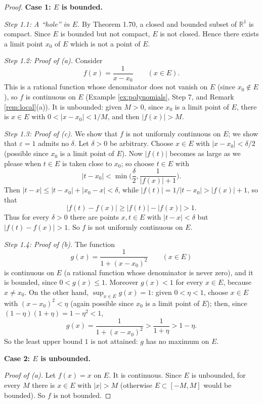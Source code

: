 \documentclass{article}
\theoremstyle{mythm}
\begin{document}
\begin{proof}
\textbf{Case 1: $E$ is bounded.}

\textit{Step 1.1: A ``hole'' in $E$.} By Theorem 1.70, a closed and bounded subset of $\mathbb{R}^1$ is compact. Since $E$ is bounded but not compact, $E$ is not closed. Hence there exists a limit point $x_0$ of $E$ which is not a point of $E$.

\textit{Step 1.2: Proof of (a).} Consider
\[
f(x) = \frac{1}{x - x_0} \qquad (x \in E).
\]
This is a rational function whose denominator does not vanish on $E$ (since $x_0 \notin E$), so $f$ is continuous on $E$ (Example \ref{ex:polynomials}, Step 7, and Remark \ref{rem:local}(a)). It is unbounded: given $M > 0$, since $x_0$ is a limit point of $E$, there is $x \in E$ with $0 < |x - x_0| < 1/M$, and then $|f(x)| > M$.

\textit{Step 1.3: Proof of (c).} We show that $f$ is not uniformly continuous on $E$; we show that $\varepsilon = 1$ admits no $\delta$. Let $\delta > 0$ be arbitrary. Choose $x \in E$ with $|x - x_0| < \delta/2$ (possible since $x_0$ is a limit point of $E$). Now $|f(t)|$ becomes as large as we please when $t \in E$ is taken close to $x_0$; so choose $t \in E$ with
\[
|t - x_0| < \min\Big( \frac{\delta}{2}, \frac{1}{|f(x)| + 1} \Big).
\]
Then $|t - x| \leq |t - x_0| + |x_0 - x| < \delta$, while $|f(t)| = 1/|t - x_0| > |f(x)| + 1$, so that
\[
|f(t) - f(x)| \geq |f(t)| - |f(x)| > 1.
\]
Thus for every $\delta > 0$ there are points $x, t \in E$ with $|t - x| < \delta$ but $|f(t) - f(x)| > 1$. So $f$ is not uniformly continuous on $E$.

\textit{Step 1.4: Proof of (b).} The function
\[
g(x) = \frac{1}{1 + (x - x_0)^2} \qquad (x \in E)
\]
is continuous on $E$ (a rational function whose denominator is never zero), and it is bounded, since $0 < g(x) \leq 1$. Moreover $g(x) < 1$ for every $x \in E$, because $x \neq x_0$. On the other hand, $\sup_{x\in E} g(x) = 1$: given $0 < \eta < 1$, choose $x \in E$ with $(x - x_0)^2 < \eta$ (again possible since $x_0$ is a limit point of $E$); then, since $(1-\eta)(1+\eta) = 1 - \eta^2 < 1$,
\[
g(x) = \frac{1}{1 + (x-x_0)^2} > \frac{1}{1 + \eta} > 1 - \eta.
\]
So the least upper bound $1$ is not attained: $g$ has no maximum on $E$.

\textbf{Case 2: $E$ is unbounded.}

\textit{Proof of (a).} Let $f(x) = x$ on $E$. It is continuous. Since $E$ is unbounded, for every $M$ there is $x \in E$ with $|x| > M$ (otherwise $E \subset [-M, M]$ would be bounded). So $f$ is not bounded.


\end{proof}
\end{document}
